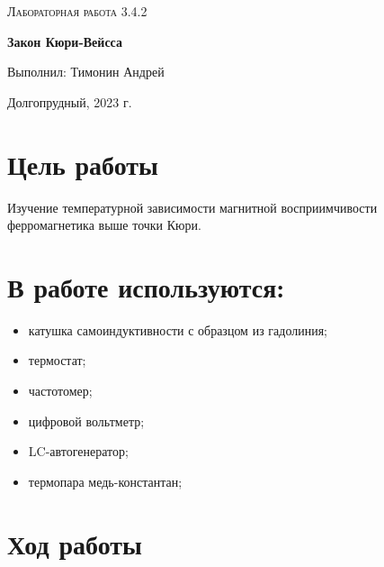 \documentclass[a4paper]{article}
\begin{document}
\begin{titlepage}
	\centering
	\vspace{5cm}
	\vspace{4cm}
	{\scshape\Large Лабораторная работа 3.4.2\par}
	\vspace{1cm}
	{\huge\bfseries Закон Кюри-Вейсса\par}
	\vspace{1cm}
	\vfill
\begin{flushright}
	\vspace{0.3cm}
	{\LARGE Выполнил: Тимонин Андрей}
\end{flushright}
	

	\vfill

	Долгопрудный, 2023 г.
\end{titlepage}

\section{Цель работы}

Изучение температурной зависимости магнитной восприимчивости ферромагнетика выше точки Кюри.

\section{В работе используются:}
\begin{itemize}
    \item катушка самоиндуктивности с образцом из гадолиния;
    \item термостат;
    \item частотомер;
    \item цифровой вольтметр;
    \item LC-автогенератор;
    \item термопара медь-константан;
\end{itemize}

\section{Ход работы}
\end{document}
